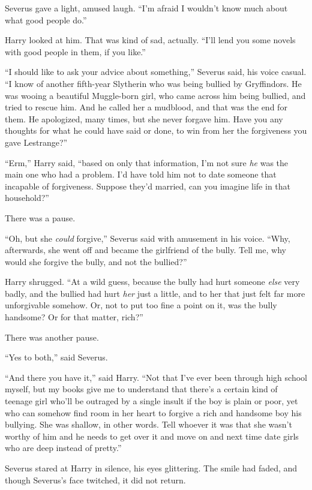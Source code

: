 Severus gave a light, amused laugh. “I’m afraid I wouldn’t know much about what good people do.”

Harry looked at him. That was kind of sad, actually. “I’ll lend you some novels with good people in them, if you like.”

“I should like to ask your advice about something,” Severus said, his voice casual. “I know of another fifth-year Slytherin who was being bullied by Gryffindors. He was wooing a beautiful Muggle-born girl, who came across him being bullied, and tried to rescue him. And he called her a mudblood, and that was the end for them. He apologized, many times, but she never forgave him. Have you any thoughts for what he could have said or done, to win from her the forgiveness you gave Lestrange?”

“Erm,” Harry said, “based on only that information, I’m not sure \emph{he} was the main one who had a problem. I’d have told him not to date someone that incapable of forgiveness. Suppose they’d married, can you imagine life in that household?”

There was a pause.

“Oh, but she \emph{could} forgive,” Severus said with amusement in his voice. “Why, afterwards, she went off and became the girlfriend of the bully. Tell me, why would she forgive the bully, and not the bullied?”

Harry shrugged. “At a wild guess, because the bully had hurt someone \emph{else} very badly, and the bullied had hurt \emph{her} just a little, and to her that just felt far more unforgivable somehow. Or, not to put too fine a point on it, was the bully handsome? Or for that matter, rich?”

There was another pause.

“Yes to both,” said Severus.

“And there you have it,” said Harry. “Not that I’ve ever been through high school myself, but my books give me to understand that there’s a certain kind of teenage girl who’ll be outraged by a single insult if the boy is plain or poor, yet who can somehow find room in her heart to forgive a rich and handsome boy his bullying. She was shallow, in other words. Tell whoever it was that she wasn’t worthy of him and he needs to get over it and move on and next time date girls who are deep instead of pretty.”

Severus stared at Harry in silence, his eyes glittering. The smile had faded, and though Severus’s face twitched, it did not return.

